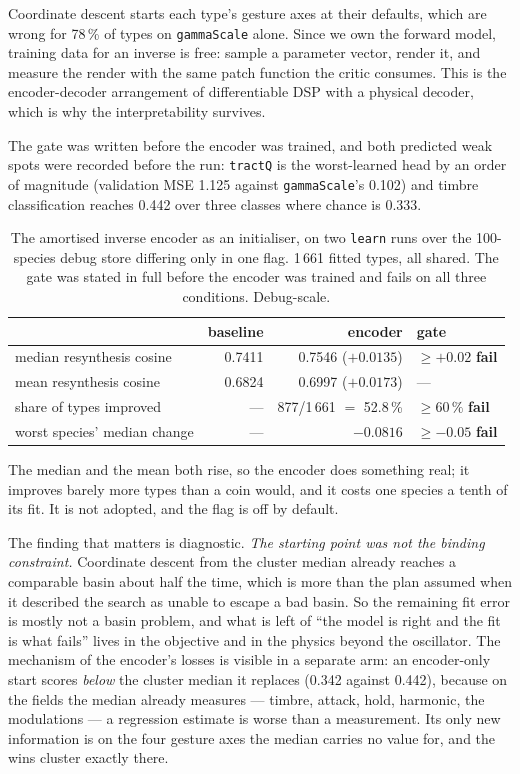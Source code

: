\documentclass[10pt,twocolumn,a4paper]{article}
\begin{document}
Coordinate descent starts each type's gesture axes at their defaults, which are wrong for
78\,\% of types on \texttt{gammaScale} alone. Since we own the forward model, training data
for an inverse is free: sample a parameter vector, render it, and measure the render with
the same patch function the critic consumes. This is the encoder-decoder arrangement of
differentiable DSP \citep{ddsp2020} with a physical decoder, which is why the
interpretability survives.

The gate was written before the encoder was trained, and both predicted weak spots were
recorded before the run: \texttt{tractQ} is the worst-learned head by an order of magnitude
(validation MSE 1.125 against \texttt{gammaScale}'s 0.102) and timbre classification reaches
0.442 over three classes where chance is 0.333.

\begin{table}[t]
\centering
\small
\caption{The amortised inverse encoder as an initialiser, on two \texttt{learn} runs over
the 100-species debug store differing only in one flag. 1\,661 fitted types, all shared. The
gate was stated in full before the encoder was trained and fails on all three conditions.
Debug-scale.}
\label{tab:inverse}
\begin{tabular}{L{6.4cm} r r L{3.0cm}}
\toprule
& baseline & encoder & gate \\
\midrule
median resynthesis cosine & 0.7411 & 0.7546 \; ($+0.0135$) & $\ge +0.02$ \quad \textbf{fail} \\
mean resynthesis cosine & 0.6824 & 0.6997 \; ($+0.0173$) & --- \\
share of types improved & --- & 877/1\,661 $=$ 52.8\,\% & $\ge 60\,\%$ \quad \textbf{fail} \\
worst species' median change & --- & $-0.0816$ & $\ge -0.05$ \quad \textbf{fail} \\
\bottomrule
\end{tabular}
\end{table}

The median and the mean both rise, so the encoder does something real; it improves barely
more types than a coin would, and it costs one species a tenth of its fit. It is not
adopted, and the flag is off by default.

The finding that matters is diagnostic. \emph{The starting point was not the binding
constraint.} Coordinate descent from the cluster median already reaches a comparable basin
about half the time, which is more than the plan assumed when it described the search as
unable to escape a bad basin. So the remaining fit error is mostly not a basin problem, and
what is left of ``the model is right and the fit is what fails'' lives in the objective and
in the physics beyond the oscillator. The mechanism of the encoder's losses is visible in a
separate arm: an encoder-only start scores \emph{below} the cluster median it replaces (0.342
against 0.442), because on the fields the median already measures --- timbre, attack, hold,
harmonic, the modulations --- a regression estimate is worse than a measurement. Its only
new information is on the four gesture axes the median carries no value for, and the wins
cluster exactly there.
\end{document}
